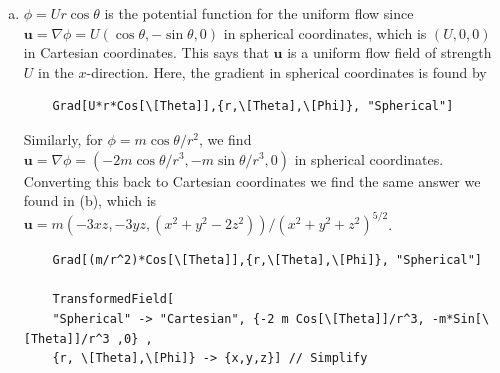\documentclass[11pt]{article}
\begin{document}
\begin{enumerate}[(a)]
	
	
	\item $\phi = U r \cos\theta$ is the potential function for the uniform flow since $\mathbf{u} = \nabla \phi = U(\cos\theta, -\sin\theta,0)$ in spherical coordinates, which is $(U,0,0)$ in Cartesian coordinates. This says that $\mathbf{u}$ is a uniform flow field of strength $U$ in the $x$-direction. Here, the gradient in spherical coordinates is found by 
	\begin{lstlisting}
	Grad[U*r*Cos[\[Theta]],{r,\[Theta],\[Phi]}, "Spherical"]
	\end{lstlisting}
	
	Similarly, for $\phi = m\cos\theta/r^2$, we find $\mathbf{u} = \nabla \phi = (-2m\cos\theta/r^3, -m\sin\theta/r^3,0)$ in spherical coordinates. Converting this back to Cartesian coordinates we find the same answer we found in (b), which is $\mathbf{u} = m(-3xz,-3yz, (x^2+y^2-2z^2) )/(x^2+y^2+z^2)^{5/2}$.
	\begin{lstlisting}
	Grad[(m/r^2)*Cos[\[Theta]],{r,\[Theta],\[Phi]}, "Spherical"]
	
	TransformedField[ 
	"Spherical" -> "Cartesian", {-2 m Cos[\[Theta]]/r^3, -m*Sin[\[Theta]]/r^3 ,0} , 
	{r, \[Theta],\[Phi]} -> {x,y,z}] // Simplify
	\end{lstlisting}
	
\end{enumerate}
\end{document}
